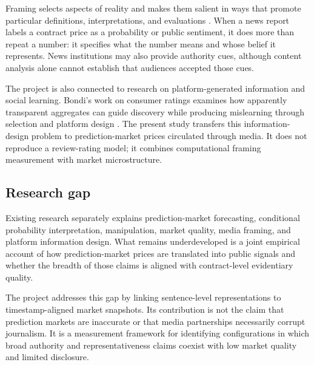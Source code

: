 Framing selects aspects of reality and makes them salient in ways that promote particular definitions, interpretations, and evaluations \citep{entman1993framing}. When a news report labels a contract price as a probability or public sentiment, it does more than repeat a number: it specifies what the number means and whose belief it represents. News institutions may also provide authority cues, although content analysis alone cannot establish that audiences accepted those cues.

The project is also connected to research on platform-generated information and social learning. Bondi's work on consumer ratings examines how apparently transparent aggregates can guide discovery while producing mislearning through selection and platform design \citep{bondi2019alone,bondi2023social}. The present study transfers this information-design problem to prediction-market prices circulated through media. It does not reproduce a review-rating model; it combines computational framing measurement with market microstructure.

\subsection{Research gap}

Existing research separately explains prediction-market forecasting, conditional probability interpretation, manipulation, market quality, media framing, and platform information design. What remains underdeveloped is a joint empirical account of how prediction-market prices are translated into public signals and whether the breadth of those claims is aligned with contract-level evidentiary quality.

The project addresses this gap by linking sentence-level representations to timestamp-aligned market snapshots. Its contribution is not the claim that prediction markets are inaccurate or that media partnerships necessarily corrupt journalism. It is a measurement framework for identifying configurations in which broad authority and representativeness claims coexist with low market quality and limited disclosure.
